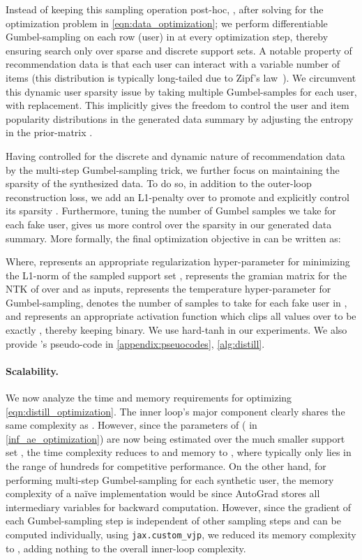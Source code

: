 \documentclass{article}
\begin{document}
Instead of keeping this sampling operation post-hoc, \ie, after solving for the optimization problem in \cref{eqn:data_optimization}; we perform differentiable Gumbel-sampling \cite{gumbel} on each row (user) in  at every optimization step, thereby ensuring search only over sparse and discrete support sets. A notable property of recommendation data is that each user can interact with a variable number of items (this distribution is typically long-tailed due to Zipf's law~\cite{mlperf-dlrm}). We circumvent this dynamic user sparsity issue by taking multiple Gumbel-samples for each user, with replacement. This implicitly gives \sampler the freedom to control the user and item popularity distributions in the generated data summary  by adjusting the entropy in the prior-matrix .



Having controlled for the discrete and dynamic nature of recommendation data by the multi-step Gumbel-sampling trick, we further focus on maintaining the sparsity of the synthesized data. To do so, in addition to the outer-loop reconstruction loss, we add an L1-penalty over  
to promote and explicitly control its sparsity 
\cite[Chapter~3]{l1_induces_sparsity}. Furthermore, tuning the number of Gumbel samples we take for each fake user, gives us more control over the sparsity in our generated data summary. More formally, the final optimization objective in \sampler can be written as:



Where,  represents an appropriate regularization hyper-parameter for minimizing the L1-norm of the sampled support set ,  represents the gramian matrix for the NTK of \model over  and  as inputs,  represents the temperature hyper-parameter for Gumbel-sampling,  denotes the number of samples to take for each fake user in , and  represents an appropriate activation function which clips all values over  to be exactly , thereby keeping  binary. We use hard-tanh in our experiments. We also provide \sampler's pseudo-code in \cref{appendix:pseuocodes}, \cref{alg:distill}.

\paragraph{Scalability.} We now analyze the time and memory requirements for optimizing \cref{eqn:distill_optimization}. The inner loop's major component clearly shares the same complexity as \model. However, since the parameters of \model ( in \cref{inf_ae_optimization}) are now being estimated over the much smaller support set , the time complexity reduces to  and memory to , where  typically only lies in the range of hundreds for competitive performance. On the other hand, for performing multi-step Gumbel-sampling for each synthetic user, the memory complexity of a na\"ive implementation would be  since AutoGrad stores all intermediary variables for backward computation. However, since the gradient of each Gumbel-sampling step is independent of other sampling steps and can be computed individually, using \texttt{jax.custom\_vjp}, we reduced its memory complexity to , adding nothing to the overall inner-loop complexity. 
\end{document}
